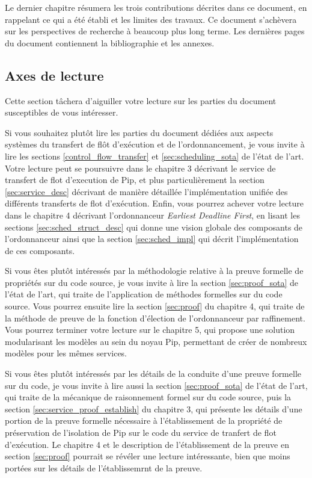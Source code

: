 Le dernier chapitre résumera les trois contributions décrites dans ce document, en rappelant ce qui a été établi et les limites des travaux. Ce document s'achèvera sur les perspectives de recherche à beaucoup plus long terme. Les dernières pages du document contiennent la bibliographie et les annexes.

\subsection{Axes de lecture}

Cette section tâchera d'aiguiller votre lecture sur les parties du document susceptibles de vous intéresser.

Si vous souhaitez plutôt lire les parties du document dédiées aux aspects systèmes du transfert de flôt d'exécution et de l'ordonnancement, je vous invite à lire les sections \ref{control_flow_transfer} et \ref{sec:scheduling_sota} de l'état de l'art. Votre lecture peut se poursuivre dans le chapitre 3 décrivant le service de transfert de flot d'execution de Pip, et plus particulièrement la section \ref{sec:service_desc} décrivant de manière détaillée l'implémentation unifiée des différents transferts de flot d'exécution. Enfin, vous pourrez achever votre lecture dans le chapitre 4 décrivant l'ordonnanceur \emph{Earliest Deadline First}, en lisant les sections \ref{sec:sched_struct_desc} qui donne une vision globale des composants de l'ordonnanceur ainsi que la section \ref{sec:sched_impl} qui décrit l'implémentation de ces composants.

Si vous êtes plutôt intéressés par la méthodologie relative à la preuve formelle de propriétés sur du code source, je vous invite à lire la section \ref{sec:proof_sota} de l'état de l'art, qui traite de l'application de méthodes formelles sur du code source. Vous pourrez ensuite lire la section \ref{sec:proof} du chapitre 4, qui traite de la méthode de preuve de la fonction d'élection de l'ordonnanceur par raffinement. Vous pourrez terminer votre lecture sur le chapitre 5, qui propose une solution modularisant les modèles au sein du noyau Pip, permettant de créer de nombreux modèles pour les mêmes services.

Si vous êtes plutôt intéressés par les détails de la conduite d'une preuve formelle sur du code, je vous invite à lire aussi la section \ref{sec:proof_sota} de l'état de l'art, qui traite de la mécanique de raisonnement formel sur du code source, puis la section \ref{sec:service_proof_establish} du chapitre 3, qui présente les détails d'une portion de la preuve formelle nécessaire à l'établissement de la propriété de préservation de l'isolation de Pip sur le code du service de tranfert de flot d'exécution. Le chapitre 4 et le description de l'établissement de la preuve en section \ref{sec:proof} pourrait se révéler une lecture intéressante, bien que moins portées sur les détails de l'établissemrnt de la preuve.
